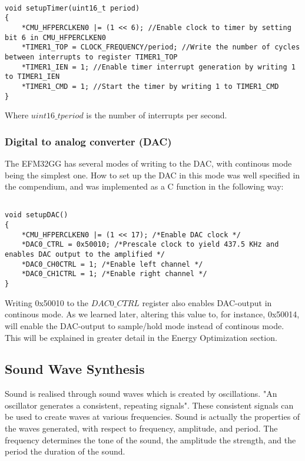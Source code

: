 \begin{lstlisting}

void setupTimer(uint16_t period)
{
	*CMU_HFPERCLKEN0 |= (1 << 6); //Enable clock to timer by setting bit 6 in CMU_HFPERCLKEN0
	*TIMER1_TOP = CLOCK_FREQUENCY/period; //Write the number of cycles between interrupts to register TIMER1_TOP
	*TIMER1_IEN = 1; //Enable timer interrupt generation by writing 1 to TIMER1_IEN
	*TIMER1_CMD = 1; //Start the timer by writing 1 to TIMER1_CMD
}

\end{lstlisting}

Where $uint16\_t period$ is the number of interrupts per second.

\subsubsection{Digital to analog converter (DAC)}

The EFM32GG has several modes of writing to the DAC, with continous mode being the simplest one. How to set up the DAC in this mode was well specified in the compendium, and was implemented as a C function in the following way:

\begin{lstlisting}

void setupDAC()
{
  	*CMU_HFPERCLKEN0 |= (1 << 17); /*Enable DAC clock */
	*DAC0_CTRL = 0x50010; /*Prescale clock to yield 437.5 KHz and enables DAC output to the amplified */
	*DAC0_CH0CTRL = 1; /*Enable left channel */
	*DAC0_CH1CTRL = 1; /*Enable right channel */
}

\end{lstlisting}

Writing 0x50010 to the $DAC0\_CTRL$ register also enables DAC-output in continous mode. As we learned later, altering  this value to, for instance, 0x50014, will enable the DAC-output to sample/hold mode instead of continous mode. This will be explained in greater detail in the Energy Optimization section.

\subsection{Sound Wave Synthesis}

Sound is realised through sound waves which is created by oscillations. "An oscillator generates a consistent, repeating signals". These consistent signals can be used to create waves at various frequencies. Sound is actually the properties of the waves generated, with respect to frequency, amplitude, and period. The frequency determines the tone of the sound, the amplitude the strength, and the period the duration of the sound.

